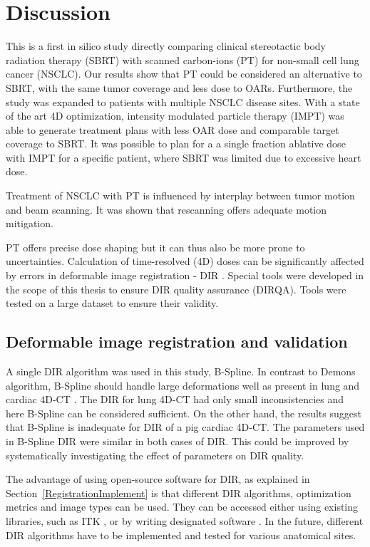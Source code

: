\chapter{Discussion}

This is a first in silico study directly comparing clinical stereotactic body radiation therapy (SBRT) with scanned carbon-ions (PT) for non-small cell lung cancer (NSCLC). 
Our results show that PT could be considered an alternative to SBRT, with the same tumor coverage and less dose to OARs. Furthermore, the study was expanded to patients with multiple
NSCLC disease sites. With a state of the art 4D optimization, intensity modulated particle therapy (IMPT) was able to generate treatment plans with less OAR dose and comparable target coverage
to SBRT. It was possible to plan for a a single fraction ablative dose with IMPT for a specific patient, where SBRT was limited due to excessive heart dose.

Treatment of NSCLC with PT is influenced by interplay between tumor motion and beam scanning. It was shown that rescanning offers
adequate motion mitigation. 

PT offers precise dose shaping but it can thus also be more prone to uncertainties. Calculation of time-resolved (4D) doses can be significantly
affected by errors in deformable image registration - DIR \cite{Heath2006}. Special tools were developed in the scope of this thesis to ensure DIR quality assurance (DIRQA).
Tools were tested on a large dataset to ensure their validity.


\section{Deformable image registration and validation}

A single DIR algorithm was used in this study, B-Spline. In contrast to Demons algorithm, B-Spline should handle large deformations well as present in lung and cardiac 4D-CT \cite{Tang2013}.
The DIR for lung 4D-CT had only small inconsistencies and here B-Spline can be considered sufficient. On the other hand, the results suggest that B-Spline is inadequate for
DIR of a pig cardiac 4D-CT. The parameters used
in B-Spline DIR were similar in both cases of DIR. This could be improved by systematically investigating the effect of parameters on DIR quality. 

The advantage of using open-source software for DIR, as explained in Section~\ref{RegistrationImplement} is that different DIR algorithms, 
optimization metrics and image types can be used. They can be accessed either using
existing libraries, such as ITK \cite{Yoo2002}, or by writing designated software \cite{Fedorov2015}. In the future, different DIR algorithms have to be implemented 
and tested for various anatomical sites.

